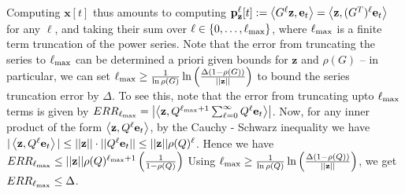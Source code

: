 Computing $\mathbf{x}[t]$ thus amounts to computing ${\mathbf{p}}_\mathbf{z}^{\ell}[t] := \left< G^{\ell}\mathbf{z}, \mathbf{e}_t \right> = \left< \mathbf{z}, (G^T)^{\ell}\mathbf{e}_t \right>$ for any $\ell$, and taking their sum over $\ell \in \{0,\ldots,\ell_{\max}\}$, where $\ell_{\max}$ is a finite term truncation of the power series.
Note that the error from truncating the series to $\ell_{\max}$ can be determined a priori given bounds for $\mathbf{z}$ and $\rho(G)$ -- in particular, we can set $\ell_{\max} \geq \frac{1}{\ln \rho(G)} \ln \left(\frac{\Delta(1 - \rho(G))}{||\mathbf{z}||} \right)$  to bound the series truncation error by $\Delta$. 
To see this, note that the error from truncating upto $\ell_{\max}$ terms is given by $ERR_{\ell_{\max}} = \left| \left< \mathbf{z},  Q^{\ell_{\max} + 1} \sum_{\ell= 0}^\infty Q^\ell\mathbf{e}_t \right> \right|$. Now, for any inner product of the form $\left< \mathbf{z}, Q^\ell \mathbf{e}_t \right>$, by the Cauchy - Schwarz inequality we have $|\left< \mathbf{z}, Q^\ell \mathbf{e}_t \right>| \leq ||\mathbf{z}|| \cdot ||{Q}^\ell \mathbf{e}_t|| \leq ||\mathbf{z}|| \rho(Q)^{\ell}$.
Hence we have
$ERR_{\lm} \leq %
 ||\mathbf{z}|| \rho(Q)^{\lm+1}\left(\frac{1}{1 - \rho(Q)} \right)$
Using $\ell_{\max} \geq \frac{1}{\ln \rho(Q)}  \ln \left(\frac{\Delta(1 - \rho(Q)) }{||\mathbf{z}||}\right)$, we get $ERR_{\ell_{\max}} \leq \Delta$.

